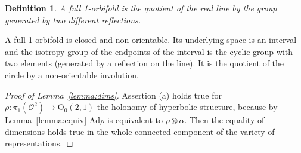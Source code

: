 \documentclass[a4paper,11pt]{article}
\newtheorem{Definition}[Theorem]{Definition}
\begin{document}
\begin{Definition}
 A \emph{full} 1-orbifold is  the quotient of the real line by the group generated by two different reflections.
 
\end{Definition}

A full 1-orbifold is closed and non-orientable. Its underlying space is an interval and the isotropy group
of the endpoints of the interval is the cyclic group with two elements (generated by a reflection on the line).
It is the quotient of the circle by a non-orientable involution.


\begin{proof}[Proof of Lemma~\ref{lemma:dims}]
Assertion (a) holds true for 
$\rho\colon\pi_1(\mathcal{O}^2)\to \mathrm{O}_0(2,1)$
the holonomy   of hyperbolic structure, 
because by Lemma~\ref{lemma:equiv}
 $\mathrm{Ad}\rho$ 
is equivalent to $\rho\otimes \alpha$.  Then the equality of dimensions  holds true in the whole connected component of 
the variety of representations. 
 

\end{proof}
\end{document}

